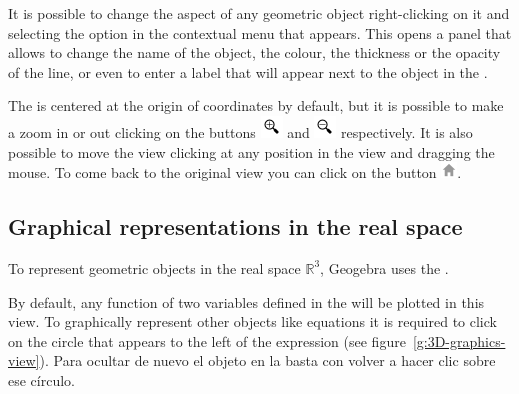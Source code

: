It is possible to change the aspect of any geometric object right-clicking on it and selecting the option  in the contextual menu that appears.
This opens a panel that allows to change the name of the object, the colour, the thickness or the opacity of the line, or even to enter a label that will appear next to the object in the .

The  is centered at the origin of coordinates by default, but it is possible to make a zoom in or out clicking on the buttons \includegraphics[scale=0.03]{img/introduction/zoom-in-button} and \includegraphics[scale=0.03]{img/introduction/zoom-out-button} respectively.
It is also possible to move the view clicking at any position in the view and dragging the mouse.
To come back to the original view you can click on the button \includegraphics[scale=0.03]{img/introduction/home-button}.


\subsection*{Graphical representations in the real space}
To represent geometric objects in the real space $\mathbb{R}^3$, Geogebra uses the .

By default, any function of two variables defined in the  will be plotted in this view.
To graphically represent other objects like equations it is required to click on the circle that appears to the left of the expression (see figure~\ref{g:3D-graphics-view}).
Para ocultar de nuevo el objeto en la  basta con volver a hacer clic sobre ese círculo.

